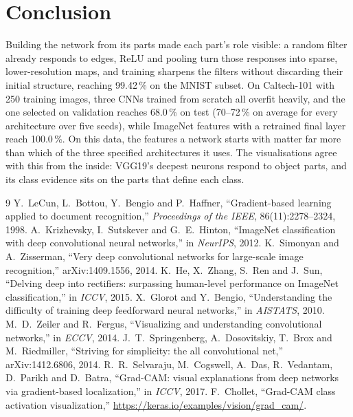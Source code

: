 \documentclass[11pt,a4paper]{article}
\begin{document}
\section{Conclusion}\label{sec:conclusion}
Building the network from its parts made each part's role visible: a random filter already
responds to edges, ReLU and pooling turn those responses into sparse, lower-resolution maps, and
training sharpens the filters without discarding their initial structure, reaching
99.42\,\% on the MNIST subset.  On Caltech-101 with 250 training images, three CNNs
trained from scratch all overfit heavily, and the one selected on validation reaches 68.0\,\% on test
(70--72\,\% on average for every architecture over five seeds), while
ImageNet features with a retrained final layer reach 100.0\,\%.  On this data, the
features a network starts with matter far more than which of the three specified architectures it
uses.  The
visualisations agree with this from the inside: VGG19's deepest neurons respond to object parts,
and its class evidence sits on the parts that define each class.

\begin{thebibliography}{9}
 Y.~LeCun, L.~Bottou, Y.~Bengio and P.~Haffner, ``Gradient-based learning applied
  to document recognition,'' \emph{Proceedings of the IEEE}, 86(11):2278--2324, 1998.
 A.~Krizhevsky, I.~Sutskever and G.~E.~Hinton, ``ImageNet classification with
  deep convolutional neural networks,'' in \emph{NeurIPS}, 2012.
 K.~Simonyan and A.~Zisserman, ``Very deep convolutional networks for large-scale
  image recognition,'' arXiv:1409.1556, 2014.
 K.~He, X.~Zhang, S.~Ren and J.~Sun, ``Delving deep into rectifiers: surpassing
  human-level performance on ImageNet classification,'' in \emph{ICCV}, 2015.
 X.~Glorot and Y.~Bengio, ``Understanding the difficulty of training deep
  feedforward neural networks,'' in \emph{AISTATS}, 2010.
 M.~D.~Zeiler and R.~Fergus, ``Visualizing and understanding convolutional
  networks,'' in \emph{ECCV}, 2014.
 J.~T.~Springenberg, A.~Dosovitskiy, T.~Brox and M.~Riedmiller, ``Striving
  for simplicity: the all convolutional net,'' arXiv:1412.6806, 2014.
 R.~R.~Selvaraju, M.~Cogswell, A.~Das, R.~Vedantam, D.~Parikh and D.~Batra,
  ``Grad-CAM: visual explanations from deep networks via gradient-based localization,'' in
  \emph{ICCV}, 2017.
 F.~Chollet, ``Grad-CAM class activation visualization,''
  \url{https://keras.io/examples/vision/grad_cam/}.
\end{thebibliography}
\end{document}
